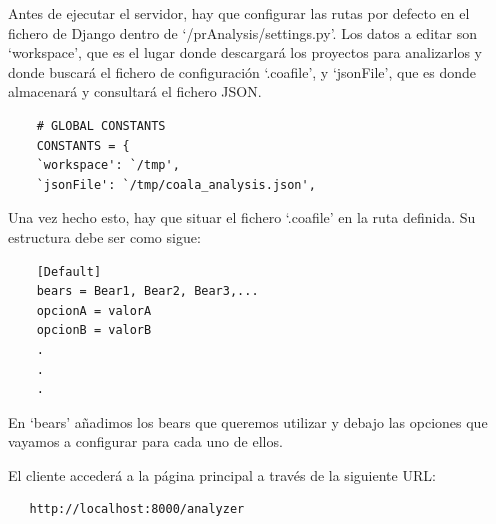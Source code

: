 \documentclass[a4paper, 12pt]{book}
\begin{document}
Antes de ejecutar el servidor, hay que configurar las rutas por defecto en el fichero de Django dentro de `/prAnalysis/settings.py'. Los datos a editar son `workspace', que es el lugar donde descargará los proyectos para analizarlos y donde buscará el fichero de configuración `.coafile', y `jsonFile', que es donde almacenará y consultará el fichero JSON.
{\footnotesize
\begin{verbatim}
    # GLOBAL CONSTANTS
    CONSTANTS = {
    `workspace': `/tmp',
    `jsonFile': `/tmp/coala_analysis.json',
\end{verbatim}
}
Una vez hecho esto, hay que situar el fichero `.coafile' en la ruta definida. Su estructura debe ser como sigue:
{\footnotesize
\begin{verbatim}
    [Default]
    bears = Bear1, Bear2, Bear3,...
    opcionA = valorA
    opcionB = valorB
    .
    .
    .
\end{verbatim}
}

En `bears' añadimos los bears que queremos utilizar y debajo las opciones que vayamos a configurar para cada uno de ellos.

El cliente accederá a la página principal a través de la siguiente URL:
{\footnotesize
\begin{verbatim}
   http://localhost:8000/analyzer
\end{verbatim}
}



\cleardoublepage


\end{document}
